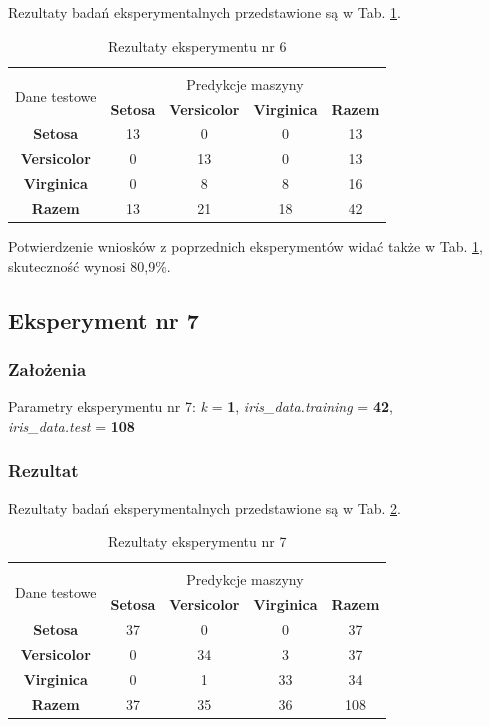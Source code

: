 \documentclass[12pt]{article}
\begin{document}
Rezultaty badań eksperymentalnych przedstawione są w Tab. \ref{wyniki6}.
\begin{table}[ht!]
 \centering
 \vspace{0.2cm}
  \begin{tabular}{|*{5}{c|}}
  \hline\\[-0.5cm]
   \multirow{2}{*}{Dane testowe} & \multicolumn{4}{c|}{Predykcje maszyny} \\ \cline{2-5}
   & \textbf{Setosa} & \textbf{Versicolor} & \textbf{Virginica} & \textbf{Razem}\\
  \hline
   \textbf{Setosa} & 13 & 0 & 0 & 13  \\ \hline
   \textbf{Versicolor} & 0 & 13 & 0 & 13  \\ \hline
   \textbf{Virginica} & 0 &  8 & 8 & 16  \\ \hline
   \textbf{Razem} & 13 & 21 & 18 & 42 \\
  \hline
 \end{tabular}
 \caption{Rezultaty eksperymentu nr 6}
 \label{wyniki6}
\end{table}

\noindent Potwierdzenie wniosków z poprzednich eksperymentów widać także w Tab. \ref{wyniki6}, skuteczność wynosi 80,9\%. \newline

\subsection{Eksperyment nr 7}
\subsubsection{Założenia}

Parametry eksperymentu nr 7: \textit{k} = \textbf{1}, \textit{iris\_data.training} = \textbf{42}, \\ \textit{iris\_data.test} = \textbf{108}

\subsubsection{Rezultat}

Rezultaty badań eksperymentalnych przedstawione są w Tab. \ref{wyniki7}.
\begin{table}[ht!]
 \centering
 \vspace{0.2cm}
  \begin{tabular}{|*{5}{c|}}
  \hline\\[-0.5cm]
   \multirow{2}{*}{Dane testowe} & \multicolumn{4}{c|}{Predykcje maszyny} \\ \cline{2-5}
   & \textbf{Setosa} & \textbf{Versicolor} & \textbf{Virginica} & \textbf{Razem}\\
  \hline
   \textbf{Setosa} & 37 & 0 & 0 & 37  \\ \hline
   \textbf{Versicolor} & 0 & 34 & 3 & 37  \\ \hline
   \textbf{Virginica} & 0 &  1 & 33 & 34  \\ \hline
   \textbf{Razem} & 37 & 35 & 36 & 108 \\
  \hline
 \end{tabular}
 \caption{Rezultaty eksperymentu nr 7}
 \label{wyniki7}
\end{table}
\end{document}

